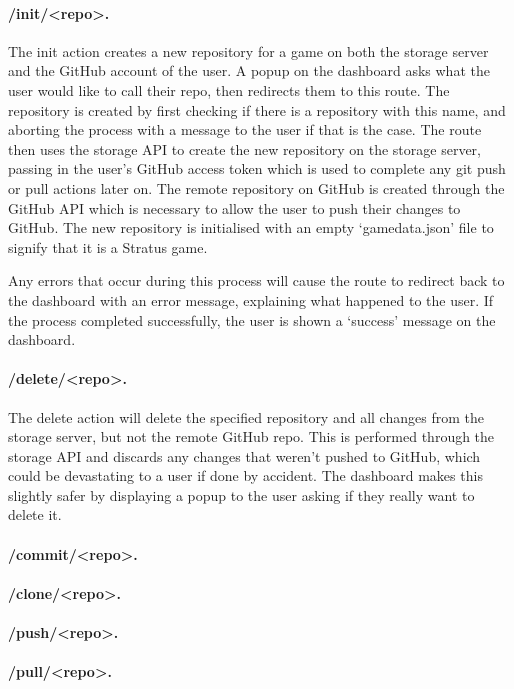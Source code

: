 	\paragraph{/init/<repo>.}
	The init action creates a new repository for a game on both the storage server and the GitHub account of the user. A popup on the dashboard asks what the user would like to call their repo, then redirects them to this route. The repository is created by first checking if there is a repository with this name, and aborting the process with a message to the user if that is the case. The route then uses the storage API to create the new repository on the storage server, passing in the user's GitHub access token which is used to complete any git push or pull actions later on. The remote repository on GitHub is created through the GitHub API which is necessary to allow the user to push their changes to GitHub. The new repository is initialised with an empty `gamedata.json' file to signify that it is a Stratus game.

	Any errors that occur during this process will cause the route to redirect back to the dashboard with an error message, explaining what happened to the user. If the process completed successfully, the user is shown a `success' message on the dashboard.

	\paragraph{/delete/<repo>.}
	The delete action will delete the specified repository and all changes from the storage server, but not the remote GitHub repo. This is performed through the storage API and discards any changes that weren't pushed to GitHub, which could be devastating to a user if done by accident. The dashboard makes this slightly safer by displaying a popup to the user asking if they really want to delete it.

	\paragraph{/commit/<repo>.}
	\paragraph{/clone/<repo>.}
	\paragraph{/push/<repo>.}
	\paragraph{/pull/<repo>.}
	
